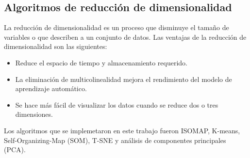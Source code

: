 \subsection{Algoritmos de reducción de dimensionalidad \label{sec:methods}}

La reducción de dimensionalidad es un proceso que disminuye el tamaño de variables o que describen a un conjunto de datos. Las ventajas de la reducción de dimensionalidad son las siguientes:

\begin{itemize}
    \item Reduce el espacio de tiempo y almacenamiento requerido.
    \item La eliminación de multicolinealidad mejora el rendimiento del modelo de aprendizaje automático.
    \item Se hace más fácil de visualizar los datos cuando se reduce dos o tres dimensiones.
\end{itemize}

Los algoritmos que se implemetaron en este trabajo fueron ISOMAP, K-means, Self-Organizing-Map (SOM), T-SNE y análisis de componentes principales (PCA).











